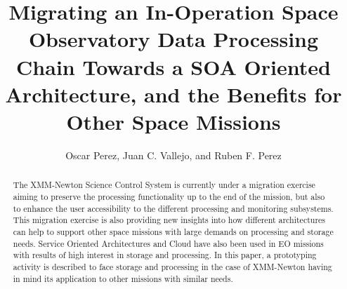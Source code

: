
\resetcounters




\title{Migrating an In-Operation Space Observatory Data Processing Chain Towards a SOA Oriented Architecture, and the Benefits for Other Space Missions}
\author{Oscar Perez, Juan C. Vallejo, and Ruben F. Perez
}


\begin{abstract}
The XMM-Newton Science Control System is currently under a migration exercise  aiming to preserve the processing functionality up to the end of the mission, but also to enhance the user accessibility to the different processing and monitoring subsystems. This migration exercise is also providing new insights into how different architectures can help to support other space missions with large demands on processing and storage needs. Service Oriented Architectures and Cloud have also been used in EO missions with results of high interest in storage and processing. In this paper, a prototyping activity is described to face storage and processing in the case of XMM-Newton having in mind its application to other missions with similar needs.    
\end{abstract}

